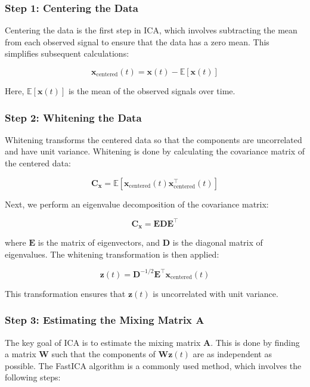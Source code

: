 \documentclass{exam}
\begin{document}
\subsubsection{Step 1: Centering the Data}

Centering the data is the first step in ICA, which involves subtracting the mean from each observed signal to ensure that the data has a zero mean. This simplifies subsequent calculations:

\[
\mathbf{x}_{\text{centered}}(t) = \mathbf{x}(t) - \mathbb{E}[\mathbf{x}(t)]
\]

Here, \( \mathbb{E}[\mathbf{x}(t)] \) is the mean of the observed signals over time.

\subsubsection{Step 2: Whitening the Data}

Whitening transforms the centered data so that the components are uncorrelated and have unit variance. Whitening is done by calculating the covariance matrix of the centered data:

\[
\mathbf{C}_{\mathbf{x}} = \mathbb{E}[\mathbf{x}_{\text{centered}}(t) \mathbf{x}_{\text{centered}}^\top(t)]
\]

Next, we perform an eigenvalue decomposition of the covariance matrix:

\[
\mathbf{C}_{\mathbf{x}} = \mathbf{E} \mathbf{D} \mathbf{E}^\top
\]

where \( \mathbf{E} \) is the matrix of eigenvectors, and \( \mathbf{D} \) is the diagonal matrix of eigenvalues. The whitening transformation is then applied:

\[
\mathbf{z}(t) = \mathbf{D}^{-1/2} \mathbf{E}^\top \mathbf{x}_{\text{centered}}(t)
\]

This transformation ensures that \( \mathbf{z}(t) \) is uncorrelated with unit variance.

\subsubsection{Step 3: Estimating the Mixing Matrix \(\mathbf{A}\)}

The key goal of ICA is to estimate the mixing matrix \( \mathbf{A} \). This is done by finding a matrix \( \mathbf{W} \) such that the components of \( \mathbf{W} \mathbf{z}(t) \) are as independent as possible. The FastICA algorithm is a commonly used method, which involves the following steps:
\end{document}
